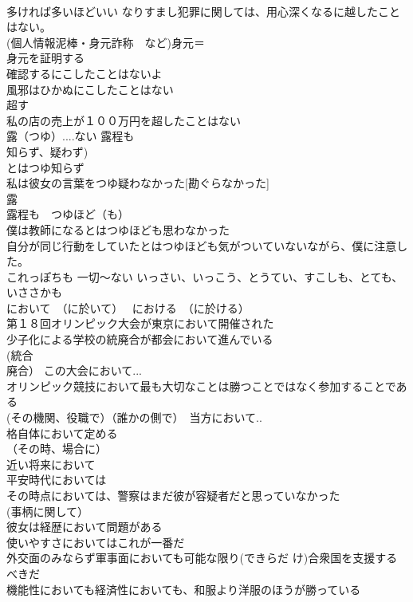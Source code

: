 \documentclass[8pt]{extreport}
\begin{document}
\begin{CJK}{UTF8}{min}
\\	多ければ多いほどいい なりすまし犯罪に関しては、用心深くなるに越したことはない。　
\\	(個人情報泥棒・身元詐称　など)身元＝
\\	身元を証明する 
\\	確認するにこしたことはないよ 
\\	風邪はひかぬにこしたことはない 
\\	超す 
\\	私の店の売上が１００万円を超したことはない 
\\	露（つゆ）....ない 露程も 
\\	知らず、疑わず)	
\\	とはつゆ知らず 
\\	私は彼女の言葉をつゆ疑わなかった[勘ぐらなかった] 
\\	露 
\\	露程も　つゆほど（も） 
\\	僕は教師になるとはつゆほども思わなかった 
\\	自分が同じ行動をしていたとはつゆほども気がついていないながら、僕に注意した。 
\\	これっぽちも 一切～ない いっさい、いっこう、とうてい、すこしも、とても、いささかも
\\	において　（に於いて）　 における　（に於ける）	
\\	第１８回オリンピック大会が東京において開催された 
\\	少子化による学校の統廃合が都会において進んでいる 
\\	(統合
\\	廃合） この大会において... 
\\	オリンピック競技において最も大切なことは勝つことではなく参加することである 
\\	(その機関、役職で）（誰かの側で）　当方において.. 
\\	格自体において定める 
\\	（その時、場合に） 
\\	近い将来において　
\\	平安時代においては 
\\	その時点においては、警察はまだ彼が容疑者だと思っていなかった　
\\	(事柄に関して） 
\\	彼女は経歴において問題がある 
\\	使いやすさにおいてはこれが一番だ 
\\	外交面のみならず軍事面においても可能な限り(できらだ け)合衆国を支援するべきだ 
\\	機能性においても経済性においても、和服より洋服のほうが勝っている 

\end{CJK}
\end{document}
